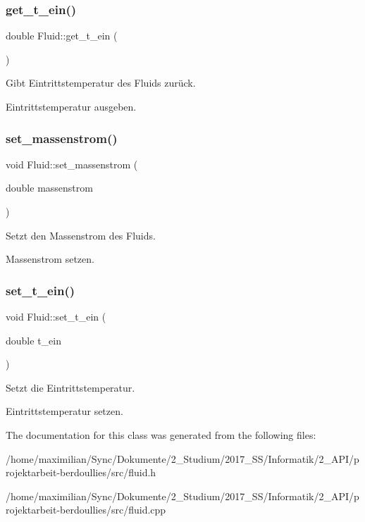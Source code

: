 \subsubsection{\texorpdfstring{get\+\_\+t\+\_\+ein()}{get\_t\_ein()}}
{\footnotesize\ttfamily double Fluid\+::get\+\_\+t\+\_\+ein (\begin{DoxyParamCaption}{ }\end{DoxyParamCaption})}



Gibt Eintrittstemperatur des Fluids zurück. 

Eintrittstemperatur ausgeben. \mbox{\label{class_fluid_af70884f77d5dd43499fcc70969100498}} 
\subsubsection{\texorpdfstring{set\+\_\+massenstrom()}{set\_massenstrom()}}
{\footnotesize\ttfamily void Fluid\+::set\+\_\+massenstrom (\begin{DoxyParamCaption}\item[{double}]{massenstrom }\end{DoxyParamCaption})}



Setzt den Massenstrom des Fluids. 

Massenstrom setzen. \mbox{\label{class_fluid_a9449846d8fd4bf31d8685eefa55d4a57}} 
\subsubsection{\texorpdfstring{set\+\_\+t\+\_\+ein()}{set\_t\_ein()}}
{\footnotesize\ttfamily void Fluid\+::set\+\_\+t\+\_\+ein (\begin{DoxyParamCaption}\item[{double}]{t\+\_\+ein }\end{DoxyParamCaption})}



Setzt die Eintrittstemperatur. 

Eintrittstemperatur setzen. 

The documentation for this class was generated from the following files\+:\begin{DoxyCompactItemize}
\item 
/home/maximilian/\+Sync/\+Dokumente/2\+\_\+\+Studium/2017\+\_\+\+S\+S/\+Informatik/2\+\_\+\+A\+P\+I/projektarbeit-\/berdoullies/src/fluid.\+h\item 
/home/maximilian/\+Sync/\+Dokumente/2\+\_\+\+Studium/2017\+\_\+\+S\+S/\+Informatik/2\+\_\+\+A\+P\+I/projektarbeit-\/berdoullies/src/fluid.\+cpp\end{DoxyCompactItemize}
